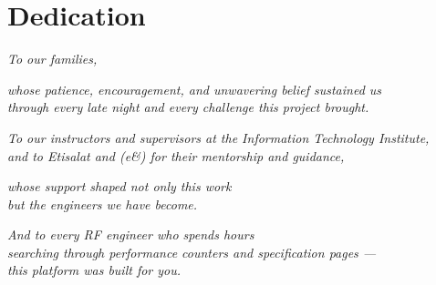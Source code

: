 \chapter*{Dedication}

\vspace*{3cm}

\begin{center}

\textit{To our families,}

\vspace{0.5cm}

\textit{whose patience, encouragement, and unwavering belief sustained us}\\
\textit{through every late night and every challenge this project brought.}

\vspace{1.5cm}

\textit{To our instructors and supervisors at the Information Technology Institute,}\\
\textit{and to Etisalat and (e\&) for their mentorship and guidance,}

\vspace{0.5cm}

\textit{whose support shaped not only this work}\\
\textit{but the engineers we have become.}

\vspace{1.5cm}

\textit{And to every RF engineer who spends hours}\\
\textit{searching through performance counters and specification pages —}\\
\textit{this platform was built for you.}

\end{center}

\clearpage
